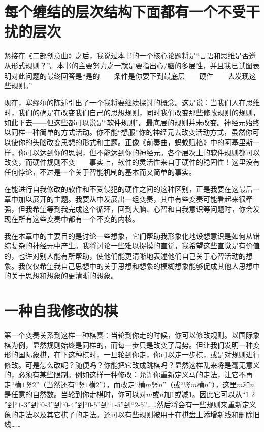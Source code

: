 \section{每个缠结的层次结构下面都有一个不受干扰的层次}

紧接在《二部创意曲》之后，我说过本书的一个核心论题将是“言语和思维是否遵从形式规则？”。本书的主要努力之一就是要指出心/脑的多层性，并且我已试图表明对此问题的最终回答是“是的——条件是你要下到最底层——硬件——去发现这些规则。”

现在，塞缪尔的陈述引出了一个我将要继续探讨的概念。这是说：当我们人在思维时，我们的确是在改变我们自己的思想规则，同时我们改变那些修改规则的规则，如此下去——但这些都可以说是“软件规则”。最底层的规则并未改变。神经元始终以同样一种简单的方式活动。你不能“想服”你的神经元去改变活动方式，虽然你可以使你的头脑改变思想的形式和主题。正像《前奏曲，蚂蚁赋格》中的阿基里斯一样，你可以达到你的思想，但不能达到你的神经元。各个层次上的软件规则都可以改变，而硬件规则不变——事实上，软件的灵活性来自于硬件的稳固性！这里没有任何悖论，不过是一个关于智能机制的基本而又简单的事实。

在能进行自我修改的软件和不受侵犯的硬件之间的这种区别，正是我要在这最后一章中加以展开的主题。我要从中发展出一组变奏，其中有些变奏可能看起来很牵强，但我希望等到我完成这个循环，回到大脑、心智和自我意识等问题时，你会发现在所有这些变奏中都有一个不变的内核。

我在本章中的主要目的是讨论一些想象，它们帮助我形象化地设想意识是如何从错综复杂的神经元中产生。我将讨论一些难以捉摸的直觉，我希望这些直觉是有价值的，也许对别人能有所帮助，使他们能更清晰地表述他们自己关于心智活动的想象。我仅仅希望我自己思想中的关于思想和想象的模糊想象能够促成其他人思想中的关于思想和想象的更清晰的想象。

\section{一种自我修改的棋}

第一个变奏关系到这样一种棋赛：当轮到你走的时候，你可以修改规则。以国际象棋为例，显然规则始终是同样的，而每一步只是改变了局势。但让我们发明一种变形的国际象棋，在下这种棋时，一旦轮到你走，你可以走一步棋，或是对规则进行修改。可是怎么改呢？随便吗？你能把它改成跳棋吗？显然这样乱来将是毫无意义的，必须有某些限制。例如这样一种修改：允许你重新定义马的走法，让它不再走“横$1$竖$2$”（当然还有“竖$1$横$2$”），而改走“横$m$竖$n$”（或“竖$m$横$n$”），这里$m$和$n$是任意的自然数。当轮到你走棋时，你可以对$m$或$n$加$1$或减$1$。因此它可以从“$1$-$2$”到“$1$-$3$”到“$0$-$3$”到“$0$-$4$”到“$0$-$5$”到“$1$-$5$”到“$2$-$5$”……然后将会有一些规则来重新定义象的走法以及其它棋子的走法。还可以有些规则被用于在棋盘上添增新线和删除旧线……

